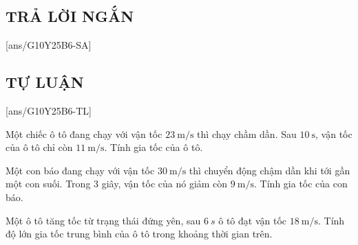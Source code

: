 \subsection{TRẢ LỜI NGẮN}
\setcounter{ex}{0}
[ans/G10Y25B6-SA]

\subsection{TỰ LUẬN}
\setcounter{ex}{0}
[ans/G10Y25B6-TL]
\begin{ex}
	Một chiếc ô tô đang chạy với vận tốc $\SI{23}{\meter/\second}$ thì chạy chầm dần. Sau $\SI{10}{\second}$, vận tốc của ô tô chỉ còn $\SI{11}{\meter/\second}$. Tính gia tốc của ô tô.
\end{ex}

\begin{ex}
	Một con báo đang chạy với vận tốc $\SI{30}{\meter/\second}$ thì chuyển động chậm dần khi tới gần một con suối. Trong 3 giây, vận tốc của nó giảm còn $\SI{9}{\meter/\second}$. Tính gia tốc của con báo.
\end{ex}

\begin{ex}
	Một ô tô tăng tốc từ trạng thái đứng yên, sau $\SI{6}{s}$ ô tô đạt vận tốc $\SI{18}{\meter/\second}$. Tính độ lớn gia tốc trung bình của ô tô trong khoảng thời gian trên.
\end{ex}

